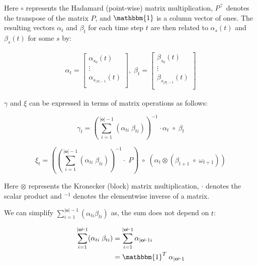 Here $\circ$ represents the Hadamard (point-wise) matrix multiplication, ${P}^\top$ denotes the transpose of the matrix ${P}$, and $\mathbbm{1}$ is a column vector of ones.
The resulting vectors ${\alpha}_t$ and ${\beta}_t$ for each time step $t$ are then related to $\alpha_s(t)$ and $\beta_s(t)$ for some $s$ by:

\begin{align}
    {\alpha}_t = \begin{bmatrix}
        \alpha_{s_0}(t)       \\
        \vdots                \\
        \alpha_{s_{|S|-1}}(t) \\
    \end{bmatrix}, \;
    {\beta}_t = \begin{bmatrix}
        \beta_{s_0}(t)       \\
        \vdots               \\
        \beta_{s_{|S|-1}}(t) \\
    \end{bmatrix}
\end{align}

$\gamma$ and $\xi$ can be expressed in terms of matrix operations as follows:

\begin{equation}
    {\gamma}_t = (\sum_{i=1}^{|\mathbf{o}|-1} (\alpha_{t i} \;\beta_{t i}))^{-1} \cdot \alpha_t \; \circ \; \beta_t
    \label{eq:gamma-matrix}
\end{equation}

\begin{equation}
    {\xi}_t = ((\sum_{i=1}^{|\mathbf{o}|-1} (\alpha_{t i} \; \beta_{t i}))^{-1} \cdot \; {P}) \; \circ \;(\alpha_t \otimes (\beta_{t+1} \; \circ \; {\omega}_{t+1}))
    \label{eq:xi-matrix}
\end{equation}

Here $\otimes$ represents the Kronecker (block) matrix multiplication, $\cdot$ denotes the scalar product and $^{-1}$ denotes the elementwise inverse of a matrix.

We can simplify $\sum_{i=1}^{|\mathbf{o}|-1} (\alpha_{t i} \beta_{t i})$ as, the sum does not depend on $t$:

\begin{align}
    \sum_{i=1}^{|\mathbf{o}|-1} (\alpha_{t i} \; \beta_{t i}) &= \sum_{i=1}^{|\mathbf{o}|-1} \alpha_{|\mathbf{o}|-1 i} \\
    &= \mathbbm{1}^T \; \alpha_{|\mathbf{o}|-1}
\end{align}

